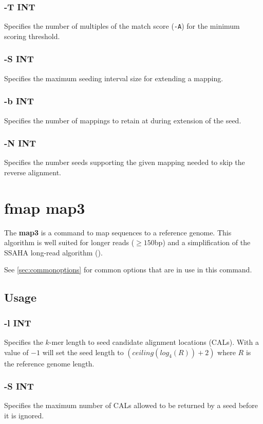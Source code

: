 \documentclass[a4paper,12pt]{book}
\newcommand{\TT}[1]{{\tt #1}} %
\newcommand{\BF}[1]{{\bf #1}} %
\begin{document}
\subsubsection{-T INT}
Specifies the number of multiples of the match score (\TT{-A}) for the minimum scoring threshold.

\subsubsection{-S INT}
Specifies the maximum seeding interval size for extending a mapping.

\subsubsection{-b INT}
Specifies the number of mappings to retain at during extension of the seed.

\subsubsection{-N INT}
Specifies the number seeds supporting the given mapping needed to skip the reverse alignment.

\section{fmap map3}
\label{sec:map3}
The \BF{map3} is a command to map sequences to a reference genome.
This algorithm is well suited for longer reads ($\geq 150$bp) and a simplification of the SSAHA long-read algorithm (\cite{SSAHA}).

See \autoref{sec:commonoptions} for common options that are in use in this command.

\subsection{Usage}

\subsubsection{-l INT}
Specifies the $k$-mer length to seed candidate alignment locations (CALs).
With a value of $-1$ will set the seed length to $\left(ceiling(log_4(R)) + 2\right)$ where $R$ is the reference genome length.

\subsubsection{-S INT}
Specifies the maximum number of CALs allowed to be returned by a seed before it is ignored.
\end{document}
